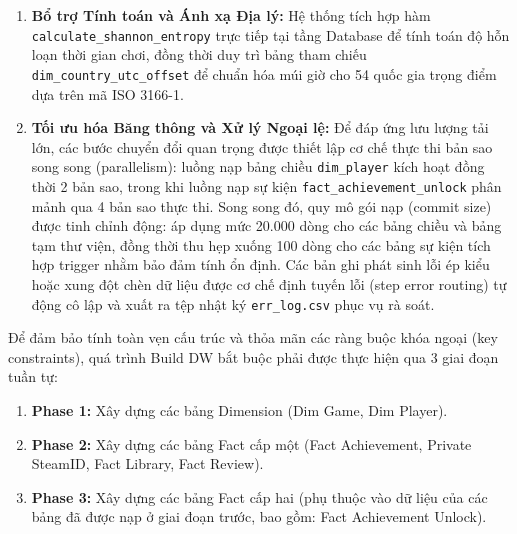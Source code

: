 \begin{enumerate}
    \begin{itemize}
        \item \textbf{Xóa bỏ bản ghi lỗi (Hard-reject):} Nếu Fact trỏ tới một \texttt{playerid} hoàn toàn không tồn tại, dòng dữ liệu đó bị xóa bỏ vì là dữ liệu rác. Cụ thể, các chốt chặn này thực thi lệnh \texttt{RETURN NULL} để gạch bỏ trong im lặng khi khóa ngoại bắt buộc khuyết thiếu hoặc phát sinh vi phạm trùng lặp khóa chính.
        \item \textbf{Tự động sinh dữ liệu ảo (Auto-stubbing):} Nếu một game hoặc một thành tựu chưa tồn tại trong dimension nhưng lại xuất hiện trong các bảng sự kiện (Fact), trigger sẽ tự động trích xuất thông tin (như \texttt{gameid} từ prefix của \texttt{achievementid}) và tạo dòng dữ liệu tạm (stub) với tiêu đề \texttt{"Unknown (auto-stub)"}. Cơ chế này bảo đảm không có bản ghi nào bị mất mát do lỗi tham chiếu, tránh làm sai lệch các chỉ số đặc trưng (feature matrix) sau này.
    \end{itemize}
    \item \textbf{Bổ trợ Tính toán và Ánh xạ Địa lý:} Hệ thống tích hợp hàm \texttt{calculate\_shannon\_entropy} trực tiếp tại tầng Database để tính toán độ hỗn loạn thời gian chơi, đồng thời duy trì bảng tham chiếu \texttt{dim\_country\_utc\_offset} để chuẩn hóa múi giờ cho 54 quốc gia trọng điểm dựa trên mã ISO 3166-1.
    \item \textbf{Tối ưu hóa Băng thông và Xử lý Ngoại lệ:} Để đáp ứng lưu lượng tải lớn, các bước chuyển đổi quan trọng được thiết lập cơ chế thực thi bản sao song song (parallelism): luồng nạp bảng chiều \texttt{dim\_player} kích hoạt đồng thời 2 bản sao, trong khi luồng nạp sự kiện \texttt{fact\_achievement\_unlock} phân mảnh qua 4 bản sao thực thi. Song song đó, quy mô gói nạp (commit size) được tinh chỉnh động: áp dụng mức 20.000 dòng cho các bảng chiều và bảng tạm thư viện, đồng thời thu hẹp xuống 100 dòng cho các bảng sự kiện tích hợp trigger nhằm bảo đảm tính ổn định. Các bản ghi phát sinh lỗi ép kiểu hoặc xung đột chèn dữ liệu được cơ chế định tuyến lỗi (step error routing) tự động cô lập và xuất ra tệp nhật ký \texttt{err\_log.csv} phục vụ rà soát.
\end{enumerate}

Để đảm bảo tính toàn vẹn cấu trúc và thỏa mãn các ràng buộc khóa ngoại (key constraints), quá trình Build DW bắt buộc phải được thực hiện qua 3 giai đoạn tuần tự:
\begin{enumerate}
    \item \textbf{Phase 1:} Xây dựng các bảng Dimension (Dim Game, Dim Player).
    \item \textbf{Phase 2:} Xây dựng các bảng Fact cấp một (Fact Achievement, Private SteamID, Fact Library, Fact Review).
    \item \textbf{Phase 3:} Xây dựng các bảng Fact cấp hai (phụ thuộc vào dữ liệu của các bảng đã được nạp ở giai đoạn trước, bao gồm: Fact Achievement Unlock).
\end{enumerate}

